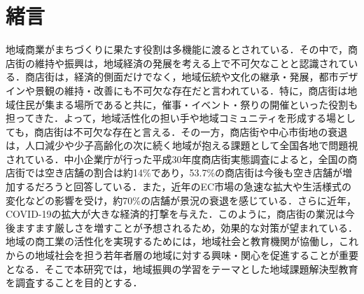 \section{緒言}

地域商業がまちづくりに果たす役割は多機能に渡るとされている．その中で，商店街の維持や振興は，地域経済の発展を考える上で不可欠なことと認識されている．商店街は，経済的側面だけでなく，地域伝統や文化の継承・発展，都市デザインや景観の維持・改善にも不可欠な存在だと言われている．特に，商店街は地域住民が集まる場所であると共に，催事・イベント・祭りの開催といった役割も担ってきた．よって，地域活性化の担い手や地域コミュニティを形成する場としても，商店街は不可欠な存在と言える．その一方，商店街や中心市街地の衰退は，人口減少や少子高齢化の次に続く地域が抱える課題として全国各地で問題視されている．中小企業庁が行った平成30年度商店街実態調査によると，全国の商店街では空き店舗の割合は約14\%であり，53.7\%の商店街は今後も空き店舗が増加するだろうと回答している．また，近年のEC市場の急速な拡大や生活様式の変化などの影響を受け，約70\%の店舗が景況の衰退を感じている．さらに近年，COVID-19の拡大が大きな経済的打撃を与えた．このように，商店街の業況は今後ますます厳しさを増すことが予想されるため，効果的な対策が望まれている．地域の商工業の活性化を実現するためには，地域社会と教育機関が協働し，これからの地域社会を担う若年者層の地域に対する興味・関心を促進することが重要となる．そこで本研究では，地域振興の学習をテーマとした地域課題解決型教育を調査することを目的とする．
